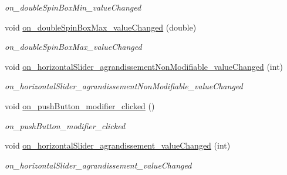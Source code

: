 \begin{DoxyCompactItemize}
\begin{DoxyCompactList}\small\item\em on\+\_\+double\+Spin\+Box\+Min\+\_\+value\+Changed \end{DoxyCompactList}\item 
\mbox{\label{classMainWindow_a9c2d4a213092fef9a1ca6341bf01f558}} 
void \hyperlink{classMainWindow_a9c2d4a213092fef9a1ca6341bf01f558}{on\+\_\+double\+Spin\+Box\+Max\+\_\+value\+Changed} (double)
\begin{DoxyCompactList}\small\item\em on\+\_\+double\+Spin\+Box\+Max\+\_\+value\+Changed \end{DoxyCompactList}\item 
\mbox{\label{classMainWindow_a37fc7ed847837660646dcf4d315f72b6}} 
void \hyperlink{classMainWindow_a37fc7ed847837660646dcf4d315f72b6}{on\+\_\+horizontal\+Slider\+\_\+agrandissement\+Non\+Modifiable\+\_\+value\+Changed} (int)
\begin{DoxyCompactList}\small\item\em on\+\_\+horizontal\+Slider\+\_\+agrandissement\+Non\+Modifiable\+\_\+value\+Changed \end{DoxyCompactList}\item 
\mbox{\label{classMainWindow_a70f495382f691edf5ac4c5b754249c21}} 
void \hyperlink{classMainWindow_a70f495382f691edf5ac4c5b754249c21}{on\+\_\+push\+Button\+\_\+modifier\+\_\+clicked} ()
\begin{DoxyCompactList}\small\item\em on\+\_\+push\+Button\+\_\+modifier\+\_\+clicked \end{DoxyCompactList}\item 
\mbox{\label{classMainWindow_acb133bc5aa31c34985de1f1d29ad17f9}} 
void \hyperlink{classMainWindow_acb133bc5aa31c34985de1f1d29ad17f9}{on\+\_\+horizontal\+Slider\+\_\+agrandissement\+\_\+value\+Changed} (int)
\begin{DoxyCompactList}\small\item\em on\+\_\+horizontal\+Slider\+\_\+agrandissement\+\_\+value\+Changed \end{DoxyCompactList}\item 
\mbox{\label{classMainWindow_adf60caef775208cb39eff294981c9e88}} 

\end{DoxyCompactItemize}
